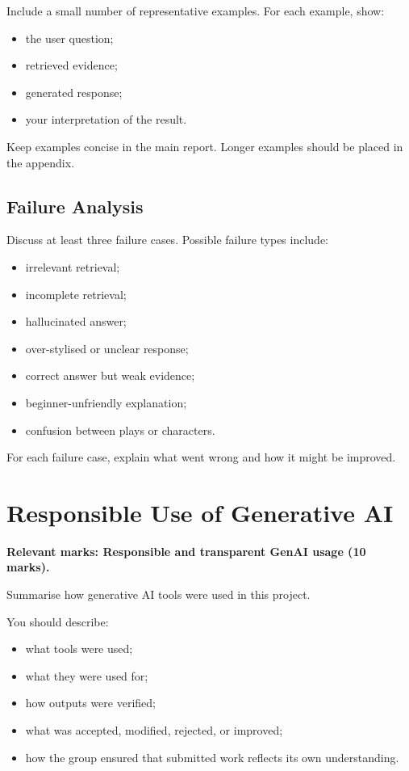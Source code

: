 \documentclass[10pt,conference]{IEEEtran}
\begin{document}
Include a small number of representative examples. 
For each example, show:

\begin{itemize}
    \item the user question;
    \item retrieved evidence;
    \item generated response;
    \item your interpretation of the result.
\end{itemize}

Keep examples concise in the main report. 
Longer examples should be placed in the appendix.

\subsection{Failure Analysis}

Discuss at least three failure cases. 
Possible failure types include:

\begin{itemize}
    \item irrelevant retrieval;
    \item incomplete retrieval;
    \item hallucinated answer;
    \item over-stylised or unclear response;
    \item correct answer but weak evidence;
    \item beginner-unfriendly explanation;
    \item confusion between plays or characters.
\end{itemize}

For each failure case, explain what went wrong and how it might be improved.

\section{Responsible Use of Generative AI}
\label{sec:genai}

\textbf{Relevant marks: Responsible and transparent GenAI usage (10 marks).}

Summarise how generative AI tools were used in this project.

You should describe:

\begin{itemize}
    \item what tools were used;
    \item what they were used for;
    \item how outputs were verified;
    \item what was accepted, modified, rejected, or improved;
    \item how the group ensured that submitted work reflects its own understanding.
\end{itemize}
\end{document}
